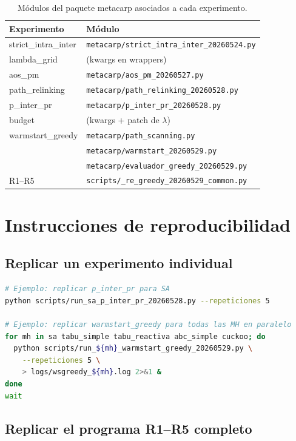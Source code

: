 \begin{table}[h]
\centering
\caption{Módulos del paquete metacarp asociados a cada experimento.}
\small
\begin{tabular}{ll}
\toprule
Experimento & Módulo \\
\midrule
strict\_intra\_inter & \texttt{metacarp/strict\_intra\_inter\_20260524.py} \\
lambda\_grid & (kwargs en wrappers) \\
aos\_pm & \texttt{metacarp/aos\_pm\_20260527.py} \\
path\_relinking & \texttt{metacarp/path\_relinking\_20260528.py} \\
p\_inter\_pr & \texttt{metacarp/p\_inter\_pr\_20260528.py} \\
budget & (kwargs + patch de $\lambda$) \\
warmstart\_greedy & \texttt{metacarp/path\_scanning.py} \\
                  & \texttt{metacarp/warmstart\_20260529.py} \\
                  & \texttt{metacarp/evaluador\_greedy\_20260529.py} \\
R1--R5 & \texttt{scripts/\_re\_greedy\_20260529\_common.py} \\
\bottomrule
\end{tabular}
\end{table}

\section{Instrucciones de reproducibilidad}

\subsection{Replicar un experimento individual}

\begin{lstlisting}[language=bash]
# Ejemplo: replicar p_inter_pr para SA
python scripts/run_sa_p_inter_pr_20260528.py --repeticiones 5

# Ejemplo: replicar warmstart_greedy para todas las MH en paralelo
for mh in sa tabu_simple tabu_reactiva abc_simple cuckoo; do
  python scripts/run_${mh}_warmstart_greedy_20260529.py \
    --repeticiones 5 \
    > logs/wsgreedy_${mh}.log 2>&1 &
done
wait
\end{lstlisting}

\subsection{Replicar el programa R1--R5 completo}

